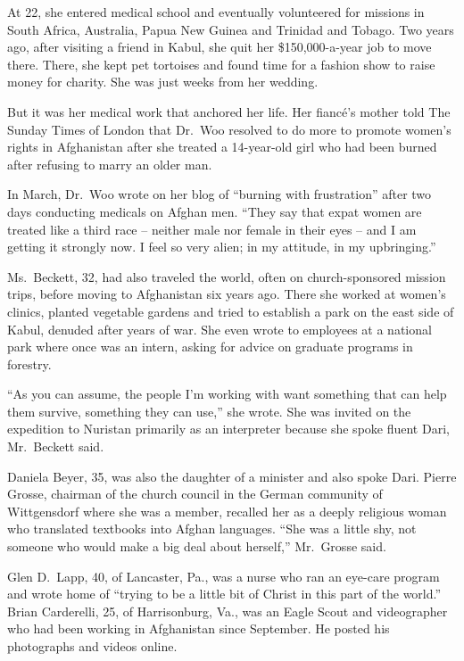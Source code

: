 ﻿\documentclass[12pt]{article}
\begin{document}
At 22, she entered medical school and eventually volunteered for missions in South Africa,
Australia, Papua New Guinea and Trinidad and Tobago. Two years ago, after visiting a friend in
Kabul, she quit her \$150,000-a-year job to move there. There, she kept pet tortoises and found time
for a fashion show to raise money for charity. She was just weeks from her wedding.

But it was her medical work that anchored her life. Her fianc\'e's mother told The Sunday Times of
London that Dr.~Woo resolved to do more to promote women's rights in Afghanistan after she treated a
14-year-old girl who had been burned after refusing to marry an older man.

In March, Dr.~Woo wrote on her blog of ``burning with frustration'' after two days conducting
medicals on Afghan men. ``They say that expat women are treated like a third race -- neither male
nor female in their eyes -- and I am getting it strongly now. I feel so very alien; in my attitude,
in my upbringing.''

Ms.~Beckett, 32, had also traveled the world, often on church-sponsored mission trips, before moving
to Afghanistan six years ago. There she worked at women's clinics, planted vegetable gardens and
tried to establish a park on the east side of Kabul, denuded after years of war. She even wrote to
employees at a national park where once was an intern, asking for advice on graduate programs in
forestry.

``As you can assume, the people I'm working with want something that can help them survive,
something they can use,'' she wrote. She was invited on the expedition to Nuristan primarily as an
interpreter because she spoke fluent Dari, Mr.~Beckett said.

Daniela Beyer, 35, was also the daughter of a minister and also spoke Dari. Pierre Grosse, chairman
of the church council in the German community of Wittgensdorf where she was a member, recalled her
as a deeply religious woman who translated textbooks into Afghan languages. ``She was a little shy,
not someone who would make a big deal about herself,'' Mr.~Grosse said.

Glen D.~Lapp, 40, of Lancaster, Pa., was a nurse who ran an eye-care program and wrote home of
``trying to be a little bit of Christ in this part of the world.'' Brian Carderelli, 25, of
Harrisonburg, Va., was an Eagle Scout and videographer who had been working in Afghanistan since
September. He posted his photographs and videos online.
\end{document}
